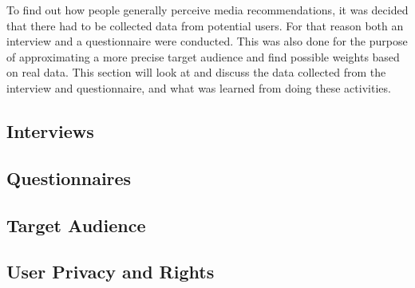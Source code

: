 To find out how people generally perceive media recommendations, it was decided that there had to be collected data from potential users. For that reason both an interview and a questionnaire were conducted. This was also done for the purpose of approximating a more precise target audience and find possible weights based on real data. This section will look at and discuss the data collected from the interview and questionnaire, and what was learned from doing these activities.
\subsection{Interviews}
\label{Interview}

\subsection{Questionnaires}
\label{Question}

\subsection{Target Audience}
\label{TargetAudience}

\subsection{User Privacy and Rights}
\label{UserRights}
